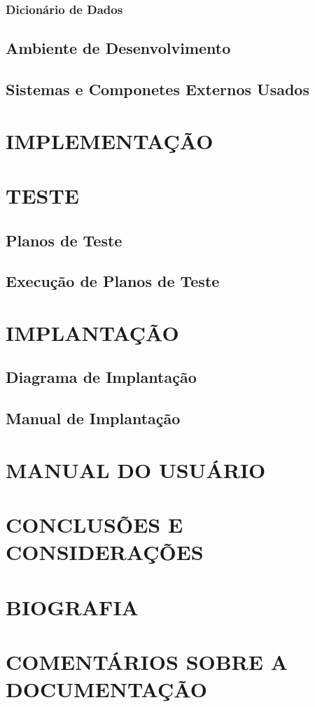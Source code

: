 \subsubsection{Dicionário de Dados}
\subsection{Ambiente de Desenvolvimento}
\subsection{Sistemas e Componetes Externos Usados}

\section{IMPLEMENTAÇÃO}

\section{TESTE}
\subsection{Planos de Teste}
\subsection{Execução de Planos de Teste}

\section{IMPLANTAÇÃO}
\subsection{Diagrama de Implantação}
\subsection{Manual de Implantação}

\section{MANUAL DO USUÁRIO}

\section{CONCLUSÕES E CONSIDERAÇÕES}

\section{BIOGRAFIA}

\section{COMENTÁRIOS SOBRE A DOCUMENTAÇÃO}
